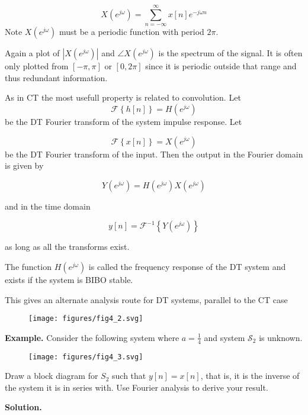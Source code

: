 \documentclass{article}
\begin{document}
\[
X\left(e^{j\omega}\right) = \sum\limits_{n = -\infty}^{\infty} x[n] e^{-j\omega n}
\]
Note $X\left(e^{j\omega}\right)$ must be a periodic function with period $2\pi$.

Again a plot of $|X\left(e^{j\omega}\right)|$ and $\angle X\left(e^{j\omega}\right)$ is the spectrum of the signal. It is often only plotted from $[-\pi, \pi]$ or $[0, 2\pi]$ since it is periodic outside that range and thus redundant information.

As in CT the most usefull property is related to convolution. Let
\[
\mathcal{F}\left\{ h[n]\right\} = H\left(e^{j\omega}\right)
\]
be the DT Fourier transform of the system impulse response. Let

\[
\mathcal{F}\left\{ x[n]\right\} = X\left(e^{j\omega}\right)
\]
be the DT Fourier transform of the input. Then the output in the Fourier domain is given by

\[
Y\left(e^{j\omega}\right) = H\left(e^{j\omega}\right) X\left(e^{j\omega}\right)
\]

and in the time domain

\[
y[n] = \mathcal{F}^{-1}\left\{ Y\left(e^{j\omega}\right) \right\}
\]

as long as all the transforms exist.

The function $H\left(e^{j\omega}\right)$ is called the frequency response of the DT system and exists if the system is BIBO stable.

This gives an alternate analysis route for DT systems, parallel to the CT case

\begin{figure}
  \centering
  \texttt{[image: figures/fig4\_2.svg]}
\end{figure}

\textbf{Example.} Consider the following system where $a = \frac{1}{4}$ and system $\mathcal{S}_2$ is unknown.

\begin{figure}
  \centering
  \texttt{[image: figures/fig4\_3.svg]}
\end{figure}

Draw a block diagram for $S_2$ such that $y[n] = x[n]$, that is, it is the inverse of the system it is in series with. Use Fourier analysis to derive your result.

\textbf{Solution.}
\end{document}
